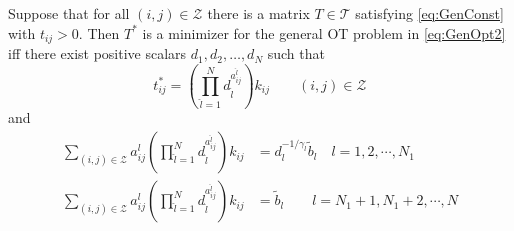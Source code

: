 \documentclass[10pt,a4paper]{amsart}
\begin{document}
\begin{lemma}
\label{lem:lem2bGen}
Suppose that for all $(i,j) \in {\mathcal Z}$ there is a matrix $T\in {\mathcal T}$ satisfying \eqref{eq:GenConst} with $t_{ij} >0$.
Then $T^*$ is a minimizer for the general OT problem in  \eqref{eq:GenOpt2} iff
there exist positive scalars $d_1,d_2, \dots, d_N$ 
 such that
\begin{equation}
\label{eq:tijstar}
t^*_{ij} = \left(\prod_{\hat{l}=1}^Nd_{\hat l }^{a^{\hat l}_{ij}} \right)
k_{ij}\qquad 
(i, j)\in \mathcal{Z}
\end{equation}
and
\begin{align}
\label{eq:dconst3}
\sum_{(i,j) \in \mathcal{Z}} a^l_{ij}
\left(\prod_{{\hat l }=1}^Nd_{\hat l }^{a^{\hat l}_{ij}} \right) k_{ij} 
&=d_{l}^{-1/\gamma_{l}} \tilde{b}_l
\quad l= 1,2, \cdots, N_1
\\
\sum_{(i,j) \in \mathcal{Z}} a^l_{ij}\left(\prod_{{\hat l}=1}^Nd_{\hat l}^{a^{\hat l}_{ij}} \right)
 k_{ij} 
&=  \tilde{b}_l
\qquad l=N_1+1, N_1+2, \cdots, N
\label{eq:dconst4}
\end{align}

\end{lemma}
\end{document}
